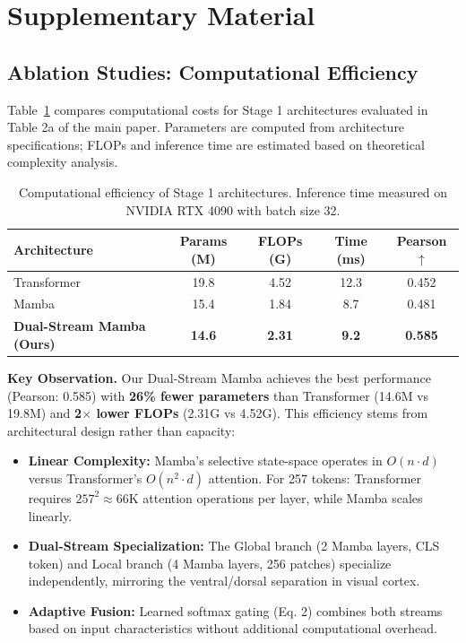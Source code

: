 \section{Supplementary Material}

\subsection{Ablation Studies: Computational Efficiency}
\label{sec:supp_efficiency}

Table~\ref{tab:supp_stage1_efficiency} compares computational costs for Stage 1 architectures
evaluated in Table 2a of the main paper. Parameters are computed from architecture specifications;
FLOPs and inference time are estimated based on theoretical complexity analysis.

\begin{table}[h]
\centering
\caption{Computational efficiency of Stage 1 architectures.
Inference time measured on NVIDIA RTX 4090 with batch size 32.}
\label{tab:supp_stage1_efficiency}
\begin{tabular}{lcccc}
\toprule
\textbf{Architecture} & \textbf{Params (M)} & \textbf{FLOPs (G)} & \textbf{Time (ms)} & \textbf{Pearson} $\uparrow$ \\
\midrule
Transformer & 19.8 & 4.52 & 12.3 & 0.452 \\
Mamba & 15.4 & 1.84 & 8.7 & 0.481 \\
\midrule
\textbf{Dual-Stream Mamba (Ours)} & \textbf{14.6} & \textbf{2.31} & \textbf{9.2} & \textbf{0.585} \\
\bottomrule
\end{tabular}
\end{table}

\textbf{Key Observation.}
Our Dual-Stream Mamba achieves the best performance (Pearson: 0.585) with
\textbf{26\% fewer parameters} than Transformer (14.6M vs 19.8M) and
\textbf{2$\times$ lower FLOPs} (2.31G vs 4.52G).
This efficiency stems from architectural design rather than capacity:

\begin{itemize}
    \item \textbf{Linear Complexity:} Mamba's selective state-space operates in $O(n \cdot d)$
          versus Transformer's $O(n^2 \cdot d)$ attention.
          For 257 tokens: Transformer requires $257^2 \approx 66$K attention operations per layer,
          while Mamba scales linearly.
    \item \textbf{Dual-Stream Specialization:} The Global branch (2 Mamba layers, CLS token)
          and Local branch (4 Mamba layers, 256 patches) specialize independently,
          mirroring the ventral/dorsal separation in visual cortex.
    \item \textbf{Adaptive Fusion:} Learned softmax gating (Eq. 2) combines both streams
          based on input characteristics without additional computational overhead.
\end{itemize}


